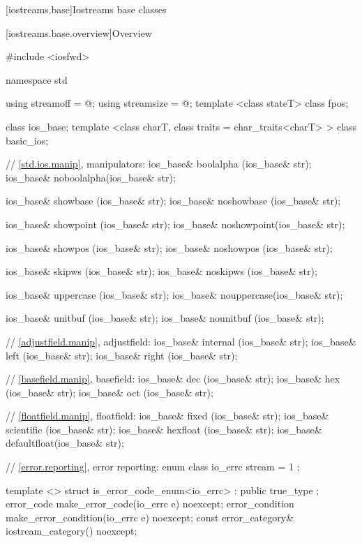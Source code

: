 [iostreams.base]{Iostreams base classes}

[iostreams.base.overview]{Overview}

%

\begin{codeblock}
#include <iosfwd>

namespace std {
  using streamoff  = @\impdef@;
  using streamsize = @\impdef@;
  template <class stateT> class fpos;

  class ios_base;
  template <class charT, class traits = char_traits<charT> >
    class basic_ios;

  // \ref{std.ios.manip}, manipulators:
  ios_base& boolalpha  (ios_base& str);
  ios_base& noboolalpha(ios_base& str);

  ios_base& showbase   (ios_base& str);
  ios_base& noshowbase (ios_base& str);

  ios_base& showpoint  (ios_base& str);
  ios_base& noshowpoint(ios_base& str);

  ios_base& showpos    (ios_base& str);
  ios_base& noshowpos  (ios_base& str);

  ios_base& skipws     (ios_base& str);
  ios_base& noskipws   (ios_base& str);

  ios_base& uppercase  (ios_base& str);
  ios_base& nouppercase(ios_base& str);

  ios_base& unitbuf    (ios_base& str);
  ios_base& nounitbuf  (ios_base& str);

  // \ref{adjustfield.manip}, adjustfield:
  ios_base& internal   (ios_base& str);
  ios_base& left       (ios_base& str);
  ios_base& right      (ios_base& str);

  // \ref{basefield.manip}, basefield:
  ios_base& dec        (ios_base& str);
  ios_base& hex        (ios_base& str);
  ios_base& oct        (ios_base& str);

  // \ref{floatfield.manip}, floatfield:
  ios_base& fixed      (ios_base& str);
  ios_base& scientific (ios_base& str);
  ios_base& hexfloat   (ios_base& str);
  ios_base& defaultfloat(ios_base& str);

  // \ref{error.reporting}, error reporting:
  enum class io_errc {
    stream = 1
  };

  template <> struct is_error_code_enum<io_errc> : public true_type { };
  error_code make_error_code(io_errc e) noexcept;
  error_condition make_error_condition(io_errc e) noexcept;
  const error_category& iostream_category() noexcept;
}
\end{codeblock}
%
%
%
%
%

